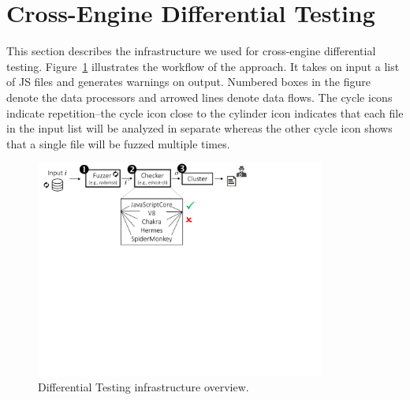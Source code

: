 \documentclass[smallextended]{svjour3}
\begin{document}

\section{Cross-Engine Differential Testing}
\label{sec:design}

This section describes the infrastructure we used for cross-engine
differential testing. Figure~\ref{fig:workflow} illustrates the
workflow of the approach. It takes on input a list of JS files and
generates warnings on output. Numbered boxes in the figure denote the
data processors and arrowed lines denote data flows. The cycle icons
indicate repetition--the cycle icon close to the cylinder icon
indicates that each file in the input list will be analyzed in
separate whereas the other cycle icon shows that a single file will be
fuzzed multiple times.

\begin{figure}[t]
  \centering
  \includegraphics[trim=0 330 170 0,clip,width=0.85\textwidth]{diff-testing-runtimes}
  \caption{\label{fig:workflow}Differential Testing infrastructure
    overview.}
\end{figure}
\end{document}
